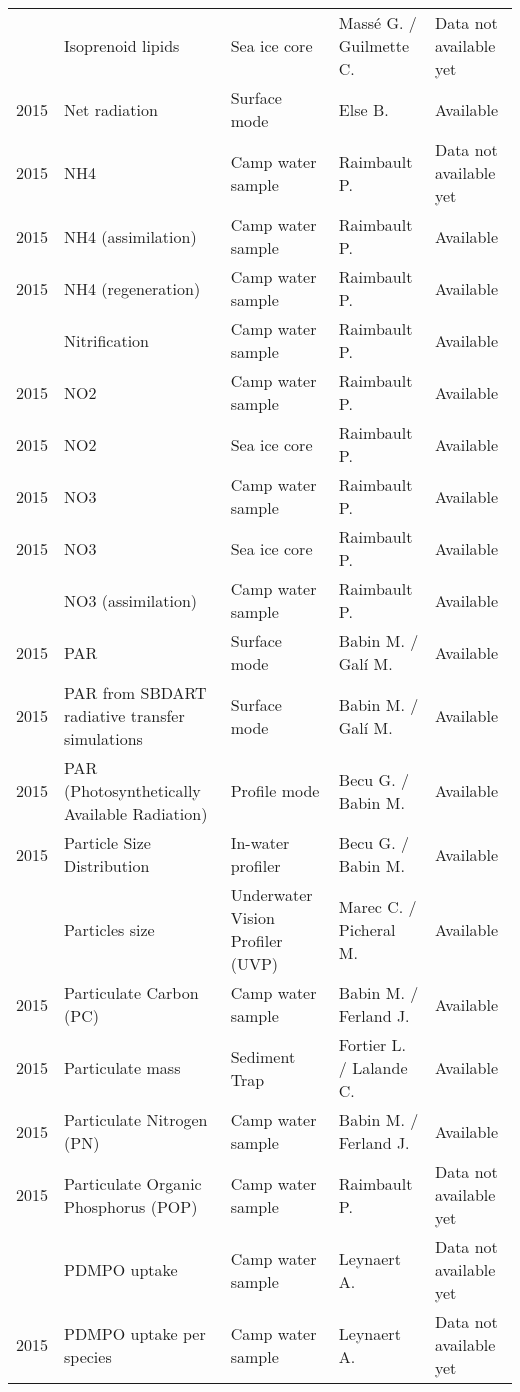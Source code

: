 \documentclass[]{article}
\begin{document}
\begin{landscape}
\begin{longtable}{rllll}
\addlinespace
2015 & Isoprenoid lipids & Sea ice core & Massé G. / Guilmette C. & Data not available yet\\
2015 & Net radiation & Surface mode & Else B. & Available\\
2015 & NH4 & Camp water sample & Raimbault P. & Data not available yet\\
2015 & NH4 (assimilation) & Camp water sample & Raimbault P. & Available\\
2015 & NH4 (regeneration) & Camp water sample & Raimbault P. & Available\\
\addlinespace
2015 & Nitrification & Camp water sample & Raimbault P. & Available\\
2015 & NO2 & Camp water sample & Raimbault P. & Available\\
2015 & NO2 & Sea ice core & Raimbault P. & Available\\
2015 & NO3 & Camp water sample & Raimbault P. & Available\\
2015 & NO3 & Sea ice core & Raimbault P. & Available\\
\addlinespace
2015 & NO3 (assimilation) & Camp water sample & Raimbault P. & Available\\
2015 & PAR & Surface mode & Babin M. / Galí M. & Available\\
2015 & PAR from SBDART radiative transfer simulations & Surface mode & Babin M. / Galí M. & Available\\
2015 & PAR (Photosynthetically Available Radiation) & Profile mode & Becu G. / Babin M. & Available\\
2015 & Particle Size Distribution & In-water profiler & Becu G. / Babin M. & Available\\
\addlinespace
2015 & Particles size & Underwater Vision Profiler (UVP) & Marec C. / Picheral M. & Available\\
2015 & Particulate Carbon (PC) & Camp water sample & Babin M. / Ferland J. & Available\\
2015 & Particulate mass & Sediment Trap & Fortier L. / Lalande C. & Available\\
2015 & Particulate Nitrogen (PN) & Camp water sample & Babin M. / Ferland J. & Available\\
2015 & Particulate Organic Phosphorus (POP) & Camp water sample & Raimbault P. & Data not available yet\\
\addlinespace
2015 & PDMPO uptake & Camp water sample & Leynaert A. & Data not available yet\\
2015 & PDMPO uptake per species & Camp water sample & Leynaert A. & Data not available yet\\

\end{longtable}
\end{landscape}
\end{document}
